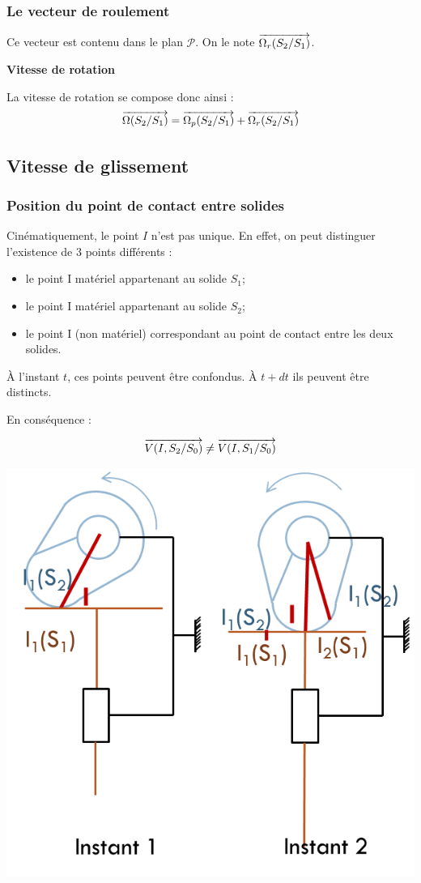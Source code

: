 \documentclass[10pt,oneside]{article}
\begin{document}
\subsubsection*{Le vecteur de roulement}
Ce vecteur est contenu dans le plan $\mathcal{P}$. On le note $\overrightarrow{\Omega_r(S_2/S_1)}$.


\begin{resultat}
\textbf{Vitesse de rotation}

La vitesse de rotation se compose donc ainsi :
$$\overrightarrow{\Omega(S_2/S_1)} = \overrightarrow{\Omega_p(S_2/S_1)} + \overrightarrow{\Omega_r(S_2/S_1)}$$
\end{resultat}



\subsection{Vitesse de glissement}
\subsubsection{Position du point de contact entre solides}
Cinématiquement, le point $I$ n'est pas unique. En effet, on peut distinguer l'existence de 3 points différents :
\begin{itemize}
\item le point I matériel appartenant au solide $S_1$;
\item le point I matériel appartenant au solide $S_2$;
\item le point I (non matériel) correspondant au point de contact entre les deux solides.
\end{itemize}

À l'instant $t$, ces points peuvent être confondus. À $t+dt$ ils peuvent être distincts.

En conséquence :
\begin{resultat}
$$
\overrightarrow{V(I,S_2/S_0)} \neq \overrightarrow{V(I,S_1/S_0)}
$$ 
\end{resultat}

\begin{exemple}
\begin{center}
\includegraphics[width=.4\textwidth]{png/ptI}
\end{center}
\end{exemple}
\end{document}
